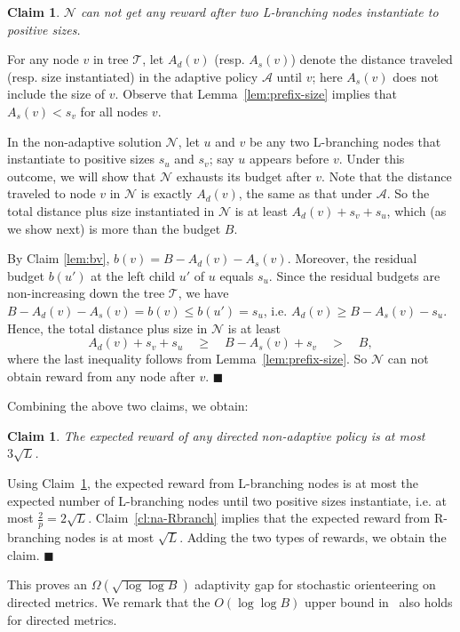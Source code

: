 \documentclass[11pt,letterpaper]{article}
\newtheorem{claim}[theorem]{Claim}
\numberwithin{algorithm}{section}
\newenvironment{proof}{

\noindent{\bf Proof:}}
{\hfill$\blacksquare$


}
\newcommand{\A}[0]{{\ensuremath{\mathcal{A}}}\xspace}
\newcommand{\N}[0]{{\ensuremath{\mathcal{N}}}\xspace}
\newcommand{\T}{\ensuremath{\mathcal{T}}\xspace}
\begin{document}
\begin{claim}\label{cl:na-Lbranch}
\N can not get any reward after two L-branching nodes instantiate to positive sizes.
\end{claim}
\begin{proof}
For any node $v$ in tree \T, let $A_d(v)$ (resp. $A_s(v)$) denote the distance traveled (resp. size instantiated) in the adaptive policy \A until $v$; here $A_s(v)$ does not include the size of $v$.  Observe that Lemma~\ref{lem:prefix-size} implies that $A_s(v)<s_v$ for all nodes $v$.

In the non-adaptive solution \N, let $u$ and $v$ be any two L-branching nodes that instantiate to positive sizes $s_u$ and $s_v$; say $u$ appears before $v$. Under this outcome, we will show that \N exhausts its budget after $v$. Note that the distance traveled to node $v$ in \N is exactly $A_d(v)$, the same as that under \A. So the total distance plus size instantiated in \N is at least $A_d(v)+s_v+s_u$, which (as we show next) is more than the budget $B$.

By Claim  \ref{lem:bv},  $b(v)=B-A_d(v)-A_s(v)$. Moreover, the residual budget $b(u')$ at the left child $u'$ of $u$ equals $s_u$. Since the residual budgets are non-increasing down the tree \T, we have $B-A_d(v)-A_s(v)=b(v) \le b(u') = s_u$, i.e. $A_d(v)\ge B-A_s(v)-s_u$. Hence, the total distance plus size in \N is at least
$$ A_d(v)+s_v+s_u \quad \geq \quad B-A_s(v)+s_v \quad > \quad B,$$
 where the last inequality follows from Lemma~\ref{lem:prefix-size}. So \N can not obtain reward from any node after $v$.
\end{proof}

Combining the above two claims, we obtain:
\begin{claim}\label{cl:mon-na}
The expected reward of any directed non-adaptive policy is at most $3\sqrt{L}$.
\end{claim}
\begin{proof}
Using Claim~\ref{cl:na-Lbranch}, the expected reward from L-branching nodes is at most the expected number of L-branching nodes until two positive sizes instantiate, i.e. at most $\frac{2}{p}=2\sqrt{L}$. Claim~\ref{cl:na-Rbranch} implies that the expected reward from R-branching nodes is at most $\sqrt{L}$. Adding the two types of rewards, we obtain the claim.
\end{proof}

This proves an $\Omega(\sqrt{\log\log B})$ adaptivity gap for stochastic orienteering on directed metrics. We remark that the $O(\log\log B)$ upper bound in~\cite{GKNR12} also holds for directed metrics.
\end{document}
